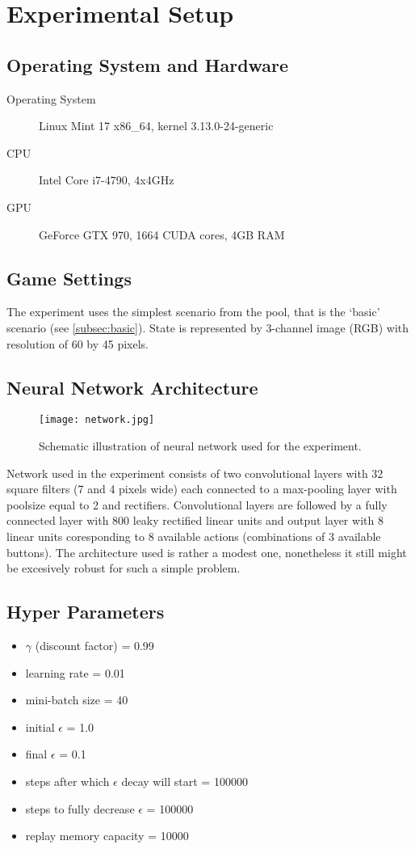 \newpage
\section{Experimental Setup} 
	\subsection{Operating System and Hardware}
	\begin{description}
		\item[Operating System] Linux Mint 17 x86\_64, kernel 3.13.0-24-generic
		\item[CPU] Intel Core i7-4790, 4x4GHz
		\item[GPU] GeForce GTX 970, 1664 CUDA cores, 4GB RAM
	\end{description}

	\subsection{Game Settings}
		The experiment uses the simplest scenario from the pool, that is the `basic' scenario (see \ref{subsec:basic}). State is represented by 3-channel image (RGB) with resolution of 60 by 45 pixels.

	\subsection{Neural Network Architecture}
		\begin{figure}
			\centering
			\texttt{[image: network.jpg]}
			\caption{Schematic illustration of neural network used for the experiment.}\label{fig:network}
		\end{figure}
		 Network used in the experiment consists of two convolutional layers with 32 square filters (7 and 4 pixels wide) each connected to a max-pooling layer with poolsize equal to 2 and rectifiers. Convolutional layers are followed by a fully connected layer with 800 leaky rectified linear units and output layer with 8 linear units coresponding to 8 available actions (combinations of 3 available buttons). The architecture used is rather a modest one, nonetheless it still might be excesively robust for such a simple problem.
	
	\subsection{Hyper Parameters}
		\begin{itemize}
		\item $\gamma$ (discount factor) = 0.99
		\item learning rate = 0.01
		\item mini-batch size = 40
		\item initial $\epsilon$ = 1.0
		\item final $\epsilon$ = 0.1
		\item steps after which $\epsilon$ decay will start = 100000
		\item steps to fully decrease $\epsilon$ = 100000
		\item replay memory  capacity = 10000
		\end{itemize}
	

